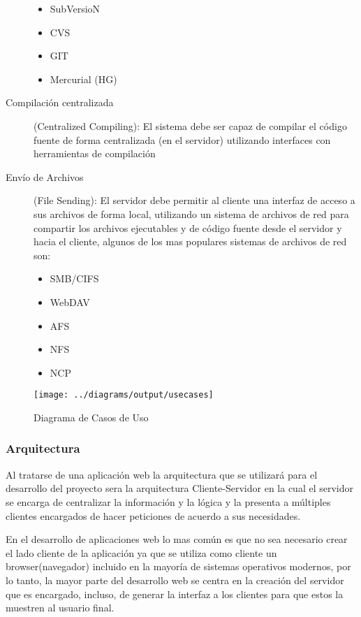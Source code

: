 \begin{description}
	\begin{itemize}
		\item SubVersioN
		\item CVS
		\item GIT
		\item Mercurial (HG)
	\end{itemize}
	
	\item [Compilación centralizada] (Centralized Compiling): \newline
	El sistema debe ser capaz de compilar el código fuente de forma centralizada (en el servidor) utilizando interfaces con herramientas de compilación
	
	\item [Envío de Archivos] (File Sending): \newline
	El servidor debe permitir al cliente una interfaz de acceso a sus archivos de forma local, utilizando un sistema de archivos de red para compartir los archivos ejecutables y de código fuente desde el servidor y hacia el cliente, algunos de los mas populares sistemas de archivos de red son:
	
	\begin{itemize}
		\item SMB/CIFS
		\item WebDAV
		\item AFS
		\item NFS
		\item NCP
	\end{itemize}
	
\end{description}

\begin{figure}
 \centering
 \texttt{[image: ../diagrams/output/usecases]}
 \caption{Diagrama de Casos de Uso}
 \label{diagrama:casos_uso}
\end{figure}


\subsubsection{Arquitectura}

Al tratarse de una aplicación web la arquitectura que se utilizará para el desarrollo del proyecto sera la arquitectura Cliente-Servidor en la cual el servidor se encarga de centralizar la información y la lógica y la presenta a múltiples clientes encargados de hacer peticiones de acuerdo a sus necesidades.

En el desarrollo de aplicaciones web lo mas común es que no sea necesario crear el lado cliente de la aplicación ya que se utiliza como cliente un browser(navegador) incluido en la mayoría de sistemas operativos modernos, por lo tanto, la mayor parte del desarrollo web se centra en la creación del servidor que es encargado, incluso, de generar la interfaz a los clientes para que estos la muestren al usuario final.

